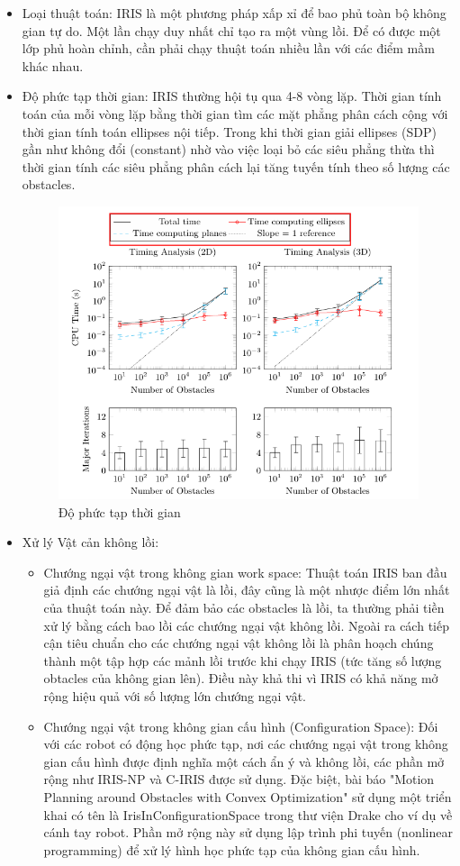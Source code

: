 \documentclass{article}
\begin{document}
\begin{itemize}
\item Loại thuật toán: IRIS là một phương pháp xấp xỉ để bao phủ toàn bộ không gian tự do. Một lần chạy duy nhất chỉ tạo ra một vùng lồi. Để có được một lớp phủ hoàn chỉnh, cần phải chạy thuật toán nhiều lần với các điểm mầm khác nhau.
\item Độ phức tạp thời gian: IRIS thường hội tụ qua 4-8 vòng lặp. Thời gian tính toán của mỗi vòng lặp bằng thời gian tìm các mặt phẳng phân cách cộng với thời gian tính toán ellipses nội tiếp. Trong khi thời gian giải ellipses (SDP) gần như không đổi (constant) nhờ vào việc loại bỏ các siêu phẳng thừa thì thời gian tính các siêu phẳng phân cách lại tăng tuyến tính theo số lượng các obstacles.  
\begin{figure}[!htp]
    \centering
    \includegraphics[width=0.5\linewidth]{imgs/time-iris.png}
    \caption{Độ phức tạp thời gian}
\end{figure}

\item Xử lý Vật cản không lồi:
\begin{itemize}
\item Chướng ngại vật trong không gian work space: Thuật toán IRIS ban đầu giả định các chướng ngại vật là lồi, đây cũng là một nhược điểm lớn nhất của thuật toán này. Để đảm bảo các obstacles là lồi, ta thường phải tiền xử lý bằng cách bao lồi  các chướng ngại vật không lồi\cite{DeitsTedrake2014}. Ngoài ra cách tiếp cận tiêu chuẩn cho các chướng ngại vật không lồi là phân hoạch chúng thành một tập hợp các mảnh lồi trước khi chạy IRIS (tức tăng số lượng obtacles của không gian lên). Điều này khả thi vì IRIS có khả năng mở rộng hiệu quả với số lượng lớn chướng ngại vật. 

\item Chướng ngại vật trong không gian cấu hình (Configuration Space): Đối với các robot có động học phức tạp, nơi các chướng ngại vật trong không gian cấu hình được định nghĩa một cách ẩn ý và không lồi, các phần mở rộng như IRIS-NP và C-IRIS được sử dụng. Đặc biệt, bài báo "Motion Planning around Obstacles with Convex Optimization" sử dụng một triển khai có tên là IrisInConfigurationSpace trong thư viện Drake cho ví dụ về cánh tay robot.\cite{motionplanning2022} Phần mở rộng này sử dụng lập trình phi tuyến (nonlinear programming) để xử lý hình học phức tạp của không gian cấu hình.
\end{itemize}
\end{itemize}
\end{document}
